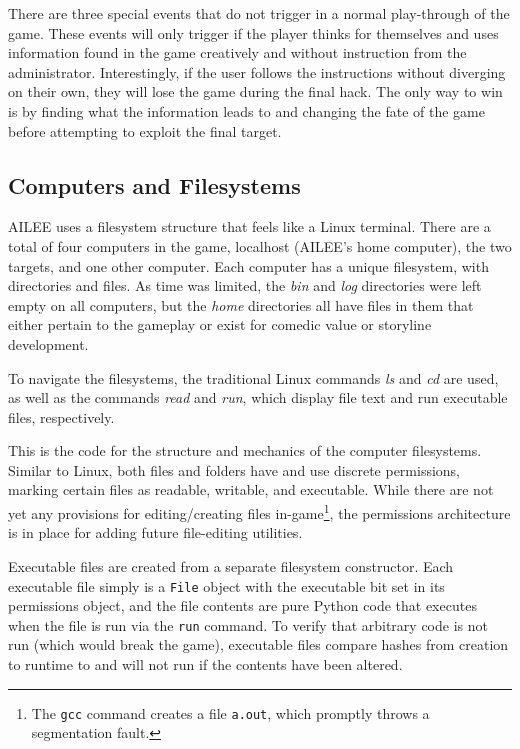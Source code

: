 \documentclass[conference]{IEEEtran}
\begin{document}
There are three special events that do not trigger in a normal play-through of the game. These events will only trigger if the player thinks for themselves and uses information found in the game creatively and without instruction from the administrator. Interestingly, if the user follows the instructions without diverging on their own, they will lose the game during the final hack. The only way to win is by finding what the information leads to and changing the fate of the game before attempting to exploit the final target.

\subsection{Computers and Filesystems}
AILEE uses a filesystem structure that feels like a Linux terminal. There are a total of four computers in the game, localhost (AILEE's home computer), the two targets, and one other computer. Each computer has a unique filesystem, with directories and files. As time was limited, the \textit{bin} and \textit{log} directories were left empty on all computers, but the \textit{home} directories all have files in them that either pertain to the gameplay or exist for comedic value or storyline development.

To navigate the filesystems, the traditional Linux commands \textit{ls} and \textit{cd} are used, as well as the commands \textit{read} and \textit{run}, which display file text and run executable files, respectively. 



This is the code for the structure and mechanics of the computer filesystems. 
Similar to Linux, both files and folders have and use discrete permissions, 
marking certain files as readable, writable, and executable.  While there are not yet any
provisions for editing/creating files in-game\footnote{The \texttt{gcc} command
creates a file \texttt{a.out}, which promptly throws a segmentation fault.},
the permissions architecture is in place for adding future file-editing
utilities.

Executable files are created from a separate filesystem constructor.  Each
executable file simply is a \texttt{File} object with the executable bit set in
its permissions object, and the file contents are pure Python code that executes
when the file is run via the \texttt{run} command.  To verify that arbitrary
code is not run (which would break the game), executable files compare hashes
from creation to runtime to and will not run if the contents have been
altered.
\end{document}
